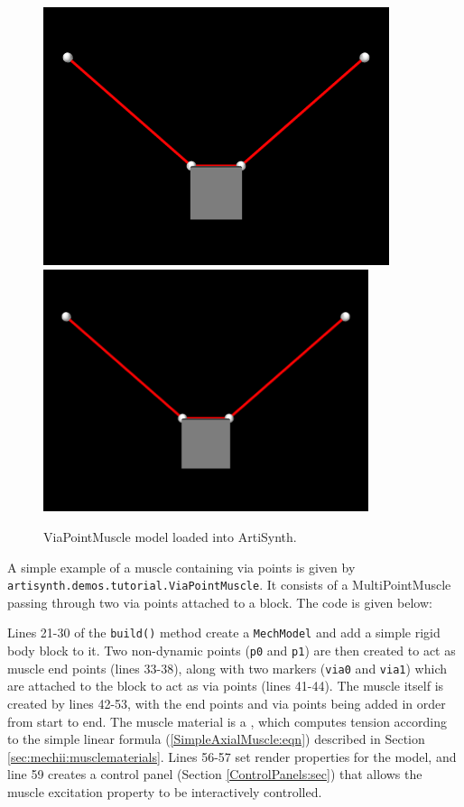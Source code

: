 \begin{figure}[t]
\begin{center}
\iflatexml
 \includegraphics[]{images/ViaPointMuscle}
\else
 \includegraphics[width=3.75in]{images/ViaPointMuscle}
\fi
\end{center}
\caption{ViaPointMuscle model loaded into ArtiSynth.}
\label{ViaPointMuscle:fig}
\end{figure}

A simple example of a muscle containing via points is given by 
{\tt artisynth.demos.tutorial.ViaPointMuscle}.  It consists
of a MultiPointMuscle passing through two via points attached to a
block. The code is given below:
\lstset{numbers=left}

\lstset{numbers=none}

Lines 21-30 of the {\tt build()} method create a {\tt MechModel} and
add a simple rigid body block to it. Two non-dynamic points ({\tt p0}
and {\tt p1}) are then created to act as muscle end points
(lines 33-38), along with two markers ({\tt via0} and {\tt via1})
which are attached to the block to act as via points
(lines 41-44). The muscle itself is created by lines 42-53, with the
end points and via points being added in order from start to end.
The muscle material is a 
,
which computes tension according to the simple linear formula 
(\ref{SimpleAxialMuscle:eqn}) described in Section 
\ref{sec:mechii:musclematerials}. Lines 56-57 set render
properties for the model, and line 59 creates a control panel
(Section \ref{ControlPanels:sec}) that allows the muscle {\sf
excitation} property to be interactively controlled.

